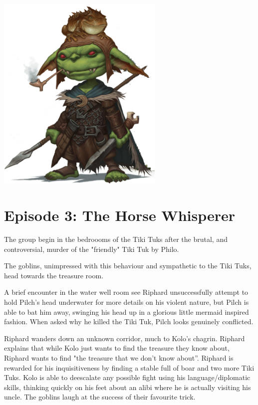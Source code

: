 \documentclass[letterpaper,10pt,twoside,twocolumn,openany]{book}
\begin{document}
\begin{center}
\includegraphics[width=80mm]{./img/kolo2.png}
\begin{figure}[h]
\end{figure}
\end{center}

\clearpage

\section{Episode 3: The Horse Whisperer}

The group begin in the bedroooms of the Tiki Tuks after the brutal, and controversial, murder of the "friendly" Tiki Tuk by Philo.

The goblins, unimpressed with this behaviour and sympathetic to the Tiki Tuks, head towards the treasure room.

A brief encounter in the water well room see Riphard unsuccessfully attempt to hold Pilch’s head underwater for more details on his violent nature, but Pilch is able to bat him away, swinging his head up in a glorious little mermaid inspired fashion. When asked why he killed the Tiki Tuk, Pilch looks genuinely conflicted.

Riphard wanders down an unknown corridor, much to Kolo's chagrin. Riphard explains that while Kolo just wants to find the treasure they know about, Riphard wants to find "the treasure that we don't know about”. Riphard is rewarded for his inquisitiveness by finding a stable full of boar and two more Tiki Tuks. Kolo is able to deescalate any possible fight using his language/diplomatic skills, thinking quickly on his feet about an alibi where he is actually visiting his uncle. The goblins laugh at the success of their favourite trick.
\end{document}
